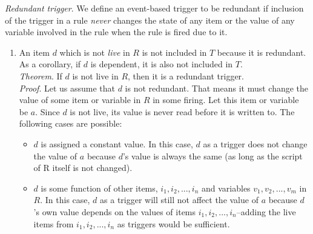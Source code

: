 \documentclass{sig-alternate-05-2015}
\begin{document}
\begin{enumerate}
\emph{Redundant trigger}. We define an event-based trigger to be redundant if inclusion of the trigger in a rule \emph{never} changes the state of any item or the value of any variable involved in the rule when the rule is fired due to it.
\begin{enumerate}
\item  An item $d$ which is not \textit{live} in $R$ is not included in $T$ because it is redundant. As a corollary, if $d$ is dependent, it is also not included in $T$.\\
\emph{Theorem}. If $d$ is not live in $R$, then it is a redundant trigger.\\
\emph{Proof}. Let us assume that $d$ is not redundant. That means it must change the value of some item or variable in $R$ in some firing. Let this item or variable be $a$. Since $d$ is not live, its value is never read before it is written to. The following cases are possible:
\begin{itemize} [topsep=-2pt, itemsep=-1pt]
\item $d$ is assigned a constant value. In this case, $d$ as a trigger does not change the value of $a$ because $d$'s value is always the same (as long as the script of R  itself is not changed).
\item $d$ is some function of other items, $i_1, i_2, ..., i_n$ and variables $v_1, v_2, ..., v_m$ in $R$. In this case, $d$ as a trigger will still not affect the value of $a$ because $d$'s own value depends on the values of items $i_1, i_2, ..., i_n$--adding the live items from $i_1, i_2, ..., i_n$ as triggers would be sufficient.
\end{itemize}
\end{enumerate}
\end{enumerate}
\end{document}
